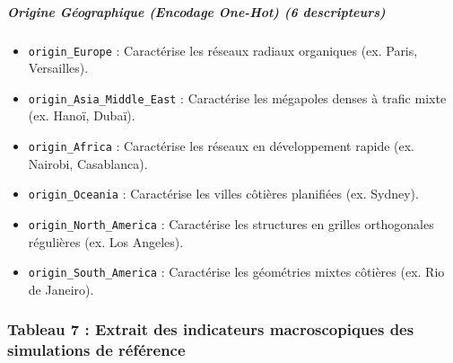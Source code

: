 \documentclass[10pt, a4paper]{article}
\providecommand{\tightlist}{}
\begin{document}
\subparagraph{Origine Géographique (Encodage One-Hot) (6
descripteurs)}\label{origine-guxe9ographique-encodage-one-hot-6-descripteurs-1}

\begin{itemize}
\tightlist
\item
  \texttt{origin\_Europe} : Caractérise les réseaux radiaux organiques
  (ex. Paris, Versailles).
\item
  \texttt{origin\_Asia\_Middle\_East} : Caractérise les mégapoles denses
  à trafic mixte (ex. Hanoï, Dubaï).
\item
  \texttt{origin\_Africa} : Caractérise les réseaux en développement
  rapide (ex. Nairobi, Casablanca).
\item
  \texttt{origin\_Oceania} : Caractérise les villes côtières planifiées
  (ex. Sydney).
\item
  \texttt{origin\_North\_America} : Caractérise les structures en
  grilles orthogonales régulières (ex. Los Angeles).
\item
  \texttt{origin\_South\_America} : Caractérise les géométries mixtes
  côtières (ex. Rio de Janeiro).
\end{itemize}

\subsubsection{Tableau 7 : Extrait des indicateurs macroscopiques des
simulations de
référence}\label{tableau-7-extrait-des-indicateurs-macroscopiques-des-simulations-de-ruxe9fuxe9rence}
\end{document}
